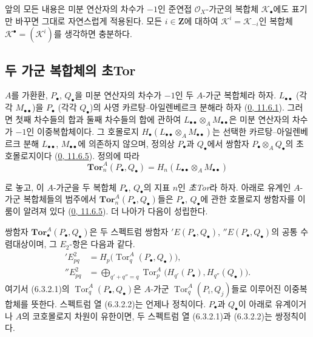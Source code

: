 \begin{env}[6.2.7]
\label{III.6.2.7-fr}
앞의 모든 내용은 미분 연산자의 차수가 $-1$인 준연접
$\mathscr O_X$-가군의 복합체 $\mathscr K_\bullet$에도 표기만 바꾸면
그대로 자연스럽게 적용된다. 모든 $i\in\mathbf Z$에 대하여
$\mathscr K^i=\mathscr K_{-i}$인 복합체
$\mathscr K^\bullet=(\mathscr K^i)$를 생각하면 충분하다.
\end{env}

\subsection{두 가군 복합체의 초Tor}
\label{subsection:III.6.3.fr}

\begin{env}[6.3.1]
\label{III.6.3.1-fr}
$A$를 가환환, $P_\bullet$, $Q_\bullet$을 미분 연산자의 차수가 $-1$인
두 $A$-가군 복합체라 하자. $L_{\bullet\bullet}$ (각각
$M_{\bullet\bullet}$)을 $P_\bullet$ (각각 $Q_\bullet$)의 사영
카르탕--아일렌베르크 분해라 하자
(\hyperref[0.11.6.1-fr]{0, 11.6.1}). 그러면 첫째 차수들의 합과 둘째
차수들의 합에 관하여
$L_{\bullet\bullet}\otimes_A M_{\bullet\bullet}$은 미분 연산자의
차수가 $-1$인 이중복합체이다. 그 호몰로지
$H_\bullet(L_{\bullet\bullet}\otimes_A M_{\bullet\bullet})$는 선택한
카르탕--아일렌베르크 분해 $L_{\bullet\bullet}$,
$M_{\bullet\bullet}$에 의존하지 않으며, 정의상 $P_\bullet$과
$Q_\bullet$에서 쌍함자 $P_\bullet\otimes_A Q_\bullet$의
초호몰로지이다 (\hyperref[0.11.6.5-fr]{0, 11.6.5}). 정의에 따라
\[
  \mathbf{Tor}_n^A(P_\bullet,Q_\bullet)
  =H_n(L_{\bullet\bullet}\otimes_A M_{\bullet\bullet})
  \tag{6.3.1.1}\label{III.6.3.1.1.fr}
\]


로 놓고, 이 $A$-가군을 두 복합체 $P_\bullet$, $Q_\bullet$의 지표
$n$인 \emph{초Tor}라 하자. 아래로 유계인 $A$-가군 복합체들의
범주에서 $\mathbf{Tor}_n^A(P_\bullet,Q_\bullet)$들은
$P_\bullet$, $Q_\bullet$에 관한 호몰로지 쌍함자를 이룸이 알려져
있다 (\hyperref[0.11.6.5-fr]{0, 11.6.5}). 더 나아가 다음이 성립한다.
\end{env}

\begin{proposition}[6.3.2]
\label{III.6.3.2-fr}
쌍함자 $\mathbf{Tor}_\bullet^A(P_\bullet,Q_\bullet)$은 두 스펙트럼
쌍함자 $'E(P_\bullet,Q_\bullet)$,
$''E(P_\bullet,Q_\bullet)$의 공통 수렴대상이며, 그 $E_2$-항은
다음과 같다.
\begin{align}
  'E^2_{pq}
    &=H_p\bigl(\operatorname{Tor}_q^A(P_\bullet,Q_\bullet)\bigr),
    \tag{6.3.2.1}\label{III.6.3.2.1.fr}\\
  ''E^2_{pq}
    &=\bigoplus_{q'+q''=q}
      \operatorname{Tor}_p^A\bigl(H_{q'}(P_\bullet),H_{q''}(Q_\bullet)\bigr).
    \tag{6.3.2.2}\label{III.6.3.2.2.fr}
\end{align}
여기서 (6.3.2.1)의
$\operatorname{Tor}_q^A(P_\bullet,Q_\bullet)$은 $A$-가군
$\operatorname{Tor}_q^A(P_i,Q_j)$들로 이루어진 이중복합체를 뜻한다.
스펙트럼 열 (6.3.2.2)는 언제나 정칙이다. $P_\bullet$과
$Q_\bullet$이 아래로 유계이거나 $A$의 코호몰로지 차원이 유한이면,
두 스펙트럼 열 (6.3.2.1)과 (6.3.2.2)는 쌍정칙이다.
\end{proposition}

